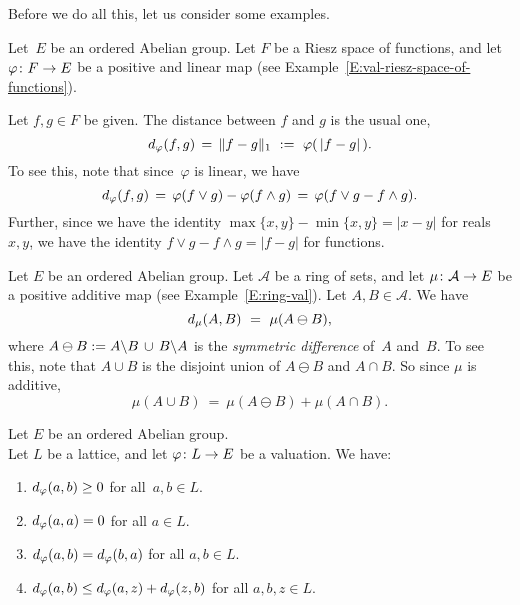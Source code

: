 \documentclass[main.tex]{subfiles}
\begin{document}
Before we do all this,
let us consider some examples.
%
%
\begin{ex}
\label{E:d-riesz}
Let~$E$ be an ordered Abelian group.
Let $F$ be a Riesz space of functions,
and let $\varphi\colon F\rightarrow E$ be
a positive and linear map
(see Example~\ref{E:val-riesz-space-of-functions}).

Let $f,g\in F$ be given.
The distance between $f$ and $g$ is the usual one,
\begin{equation*}
d_{\smash{\varphi}}(f,g) \,=\, \|f-g\|_1 \ :=\ \varphi(\,|f-g|\,).
\end{equation*}
To see this,
note that since~$\varphi$ is linear,
we have 
\begin{equation*}
d_{\smash{\varphi}}(f,g) \,=\, 
\varphi(f\vee g) - \varphi(f\wedge g)
\,=\, \varphi(f\vee g - f\wedge g).
\end{equation*}
Further,
since we have the identity $\max\{x,y\} - \min\{x,y\} = |x-y|$
for reals $x,y$,
we have the identity $f\vee g - f\wedge g = |f-g|$
for functions.
\end{ex}
\begin{ex}
Let $E$ be an ordered Abelian group.
Let $\mathcal{A}$ be a ring of sets,
and let $\mu\colon \mathcal{A}\rightarrow E$
be a positive additive map
(see Example~\ref{E:ring-val}).
Let $A,B\in\mathcal{A}$.
We have
\begin{equation*}
d_{\smash{\mu}}(A,B) \ =\ \mu(A \ominus B),
\end{equation*}
where $A\ominus B := A\backslash B \,\cup\, B\backslash A$
is the \emph{symmetric difference} of~$A$ and~$B$.
To see this, note that $A\cup B$ is the disjoint union
of $A\ominus B$ and $A\cap B$. So
since $\mu$ is additive, 
\begin{equation*}
\mu(A\cup B) \ =\ \mu(A\ominus B) + \mu(A\cap B).
\end{equation*}
\end{ex}
%
%
\begin{lem}
\label{L:d-metric}
Let $E$ be an ordered Abelian group.\\
Let $L$ be a lattice,
and let $\varphi\colon L \rightarrow E$ be a valuation.
We have:
\begin{enumerate}
\item \label{d-metric_pos}
$d_{\smash{\varphi}}(a,b)\geq 0$ for all~$a,b\in L$.
\item\label{d-metric_self} 
$d_{\smash{\varphi}}(a,a)=0$ for all $a\in L$.
\item\label{d-metric_sym}
$d_{\smash{\varphi}}(a,b)=d_{\smash{\varphi}}(b,a)$ for all $a,b\in L$.
\item\label{d-metric_triangle}
$d_{\smash{\varphi}}(a,b)\leq d_{\smash{\varphi}}(a,z)+d_{\smash{\varphi}}(z,b)$
for all $a,b,z\in L$.
\end{enumerate}
\end{lem}
\end{document}
